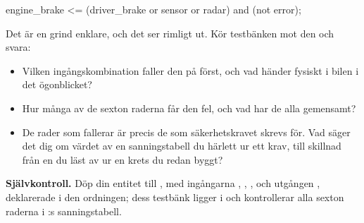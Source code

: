 \begin{vhdlcode}
engine_brake <= (driver_brake or sensor or radar) and (not error);
\end{vhdlcode}

Det är en grind enklare, och det ser rimligt ut. Kör testbänken mot den och svara:
\begin{itemize}
  \item Vilken ingångskombination faller den på först, och vad händer fysiskt i bilen i det
    ögonblicket?
  \item Hur många av de sexton raderna får den fel, och vad har de alla gemensamt?
  \item De rader som fallerar är precis de som säkerhetskravet skrevs för. Vad säger det dig om
    värdet av en sanningstabell du härlett ur ett krav, till skillnad från en du läst av ur en
    krets du redan byggt?
\end{itemize}


\begin{selfcheck}
\textbf{Självkontroll.} Döp din entitet till , med ingångarna ,
, ,  och utgången , deklarerade i den
ordningen; dess testbänk ligger i  och kontrollerar alla sexton raderna i
:s sanningstabell.
\end{selfcheck}
